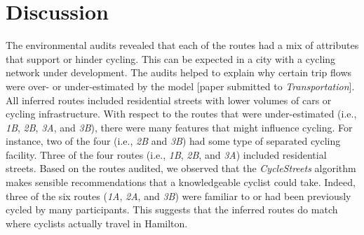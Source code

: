 \documentclass[]{elsarticle} %
\begin{document}
\hypertarget{sec:discussion}{%
\section{Discussion}\label{sec:discussion}}

The environmental audits revealed that each of the routes had a mix of
attributes that support or hinder cycling. This can be expected in a
city with a cycling network under development. The audits helped to
explain why certain trip flows were over- or under-estimated by the
model {[}paper submitted to \emph{Transportation}{]}. All inferred
routes included residential streets with lower volumes of cars or
cycling infrastructure. With respect to the routes that were
under-estimated (i.e., \emph{1B}, \emph{2B}, \emph{3A}, and \emph{3B}),
there were many features that might influence cycling. For instance, two
of the four (i.e., \emph{2B} and \emph{3B}) had some type of separated
cycling facility. Three of the four routes (i.e., \emph{1B}, \emph{2B},
and \emph{3A}) included residential streets. Based on the routes
audited, we observed that the \emph{CycleStreets} algorithm makes
sensible recommendations that a knowledgeable cyclist could take.
Indeed, three of the six routes (\emph{1A}, \emph{2A}, and \emph{3B})
were familiar to or had been previously cycled by many participants.
This suggests that the inferred routes do match where cyclists actually
travel in Hamilton.
\end{document}

